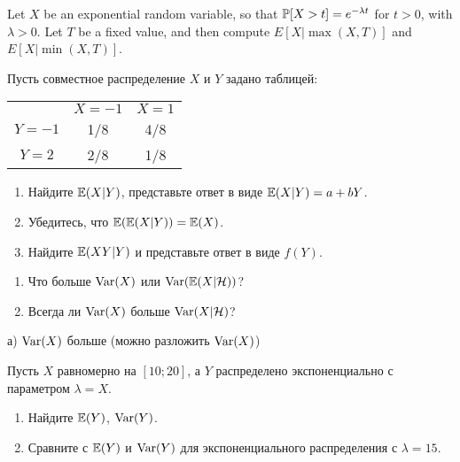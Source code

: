 \begin{problem}
 Let $X$ be an exponential random variable, so that $\P[X > t] = e^{-\lambda t}$
	for $t > 0$, with $\lambda > 0$. 	Let $T$ be a fixed value, and then compute
	$E[ X | \max(X,T) ]$ and $E[X | \min(X,T)]$.

\begin{sol}

\end{sol}
\end{problem}

\begin{problem}
 Пусть совместное распределение $X$ и $Y$ задано таблицей: \\
\begin{tabular}{ccc}
  \toprule
   & $X=-1$ & $X=1$ \\
  $Y=-1$ & 1/8 & 4/8 \\
  $Y=2$ & 2/8 & 1/8 \\
  \bottomrule
\end{tabular}
\begin{enumerate}
\item Найдите $\E(X|Y)$, представьте ответ в виде $\E(X|Y)=a+bY$.
\item Убедитесь, что $\E(\E(X|Y))=\E(X)$.
\item Найдите $\E(XY|Y)$ и представьте ответ в виде $f(Y)$.
\end{enumerate}

\begin{sol}

\end{sol}
\end{problem}

\begin{problem}
\begin{enumerate}
\item  Что больше $\Var(X)$ или $\Var(\E(X|\mathcal{H}))$?
\item Всегда ли $\Var(X)$ больше $\Var(X|\mathcal{H})$?
\end{enumerate}

\begin{sol}

 а) $\Var(X)$ больше (можно разложить $\Var(X)$)
\end{sol}
\end{problem}

\begin{problem}
Пусть $X$ равномерно на $[10;20]$, а $Y$ распределено экспоненциально с параметром $\lambda=X$.
\begin{enumerate}
\item Найдите $\E(Y)$, $\Var(Y)$.
\item Сравните с $\E(Y)$ и $\Var(Y)$ для экспоненциального распределения с $\lambda=15$.
\end{enumerate}

\begin{sol}

\end{sol}
\end{problem}


